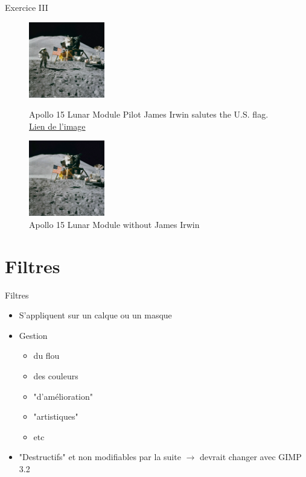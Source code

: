 \documentclass[10pt,svgnames,usenames,table]{beamer}
\begin{document}
	\begin{frame}{Exercice III}
	
		\begin{figure}[H]
			\centering
			\begin{minipage}{.5\textwidth}
				\centering
				\includegraphics[height=125px]{Images/purge/Apollo_15_flag,_rover,_LM,_Irwin}
				\caption{\tiny{Apollo 15 Lunar Module Pilot James Irwin salutes the U.S. flag.\\\href{http://louvainlinux.github.io/atelier-gimp/src/Images/purge/Apollo_15_flag,_rover,_LM,_Irwin.jpg}{Lien de l'image}}}
			\end{minipage}%
			\begin{minipage}{.5\textwidth}
				\centering
				\includegraphics[height=125px]{Images/purge/Apollo_15_flag,_rover,_LM}
				\caption{\tiny{Apollo 15 Lunar Module without James Irwin}}
			\end{minipage}
		\end{figure}	
	\end{frame}



\section{Filtres}
	\begin{frame}{Filtres}
		\begin{itemize}
			\item S'appliquent sur un calque ou un masque
			\item Gestion 
				\begin{itemize}
				\item du flou
				\item des couleurs
				\item "d'amélioration"
				\item "artistiques"
				\item etc
				\end{itemize}
			\item "Destructifs" et non modifiables par la suite $\rightarrow$ devrait changer avec GIMP 3.2
		\end{itemize}
	\end{frame}
\end{document}
